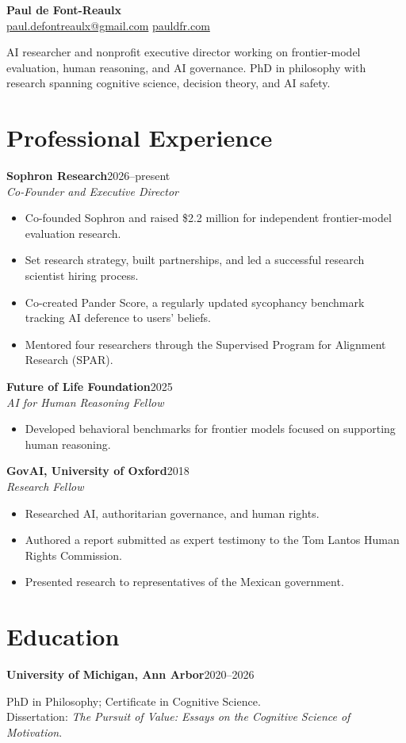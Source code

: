 \documentclass[11pt,letterpaper]{article}
\newcommand{\role}[3]{\textbf{#1}\hfill #3\\\textit{#2}\par}
\newcommand{\entry}[2]{\textbf{#1}\hfill #2\par}
\begin{document}
\begin{center}
{\LARGE\bfseries Paul de Font-Reaulx}\\[5pt]
\href{mailto:paul.defontreaulx@gmail.com}{paul.defontreaulx@gmail.com}
\quad\textbar\quad \href{https://www.pauldfr.com}{pauldfr.com}
\end{center}
\vspace{-4pt}
AI researcher and nonprofit executive director working on frontier-model evaluation, human reasoning, and AI governance. PhD in philosophy with research spanning cognitive science, decision theory, and AI safety.

\section{Professional Experience}
\role{Sophron Research}{Co-Founder and Executive Director}{2026--present}
\begin{itemize}
\item Co-founded Sophron and raised \$2.2 million for independent frontier-model evaluation research.
\item Set research strategy, built partnerships, and led a successful research scientist hiring process.
\item Co-created Pander Score, a regularly updated sycophancy benchmark tracking AI deference to users' beliefs.
\item Mentored four researchers through the Supervised Program for Alignment Research (SPAR).
\end{itemize}
\vspace{1pt}
\role{Future of Life Foundation}{AI for Human Reasoning Fellow}{2025}
\begin{itemize}
\item Developed behavioral benchmarks for frontier models focused on supporting human reasoning.
\end{itemize}
\vspace{1pt}
\role{GovAI, University of Oxford}{Research Fellow}{2018}
\begin{itemize}
\item Researched AI, authoritarian governance, and human rights.
\item Authored a report submitted as expert testimony to the Tom Lantos Human Rights Commission.
\item Presented research to representatives of the Mexican government.
\end{itemize}

\section{Education}
\entry{University of Michigan, Ann Arbor}{2020--2026}
PhD in Philosophy; Certificate in Cognitive Science.\\
Dissertation: \textit{The Pursuit of Value: Essays on the Cognitive Science of Motivation}.
\end{document}
